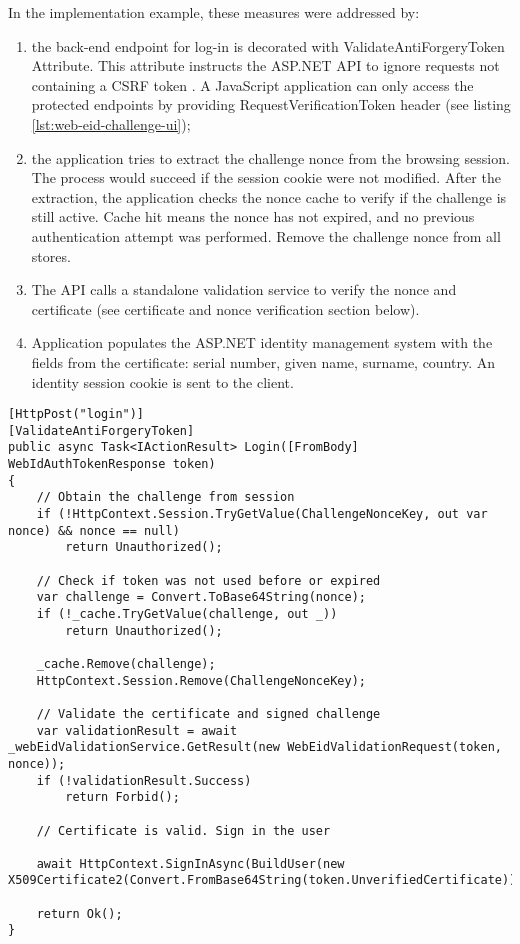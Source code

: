 In the implementation example, these measures were addressed by:
\begin{enumerate}
  \item the back-end endpoint for log-in is decorated with ValidateAntiForgeryToken Attribute. This attribute instructs the ASP.NET API to ignore requests not containing a CSRF token \cite{msdocs-anti-request-forgery}. A JavaScript application can only access the protected endpoints by providing RequestVerificationToken header (see listing \ref{lst:web-eid-challenge-ui});
  \item the application tries to extract the challenge nonce from the browsing session. The process would succeed if the session cookie were not modified. After the extraction, the application checks the nonce cache to verify if the challenge is still active. Cache hit means the nonce has not expired, and no previous authentication attempt was performed. Remove the challenge nonce from all stores.
  \item The API calls a standalone validation service to verify the nonce and certificate (see certificate and nonce verification section below).
  \item Application populates the ASP.NET identity management system with the fields from the certificate: serial number, given name, surname, country. An identity session cookie is sent to the client.
\end{enumerate}

\begin{lstlisting}[caption={Web eID Login Endpoint}, label={lst:web-eid-login}]
[HttpPost("login")]
[ValidateAntiForgeryToken]
public async Task<IActionResult> Login([FromBody] WebIdAuthTokenResponse token)
{
    // Obtain the challenge from session
    if (!HttpContext.Session.TryGetValue(ChallengeNonceKey, out var nonce) && nonce == null)
        return Unauthorized();

    // Check if token was not used before or expired
    var challenge = Convert.ToBase64String(nonce);
    if (!_cache.TryGetValue(challenge, out _))
        return Unauthorized();

    _cache.Remove(challenge);
    HttpContext.Session.Remove(ChallengeNonceKey);

    // Validate the certificate and signed challenge
    var validationResult = await _webEidValidationService.GetResult(new WebEidValidationRequest(token, nonce));
    if (!validationResult.Success)
        return Forbid();

    // Certificate is valid. Sign in the user

    await HttpContext.SignInAsync(BuildUser(new X509Certificate2(Convert.FromBase64String(token.UnverifiedCertificate)).Subject));

    return Ok();
}
\end{lstlisting}


